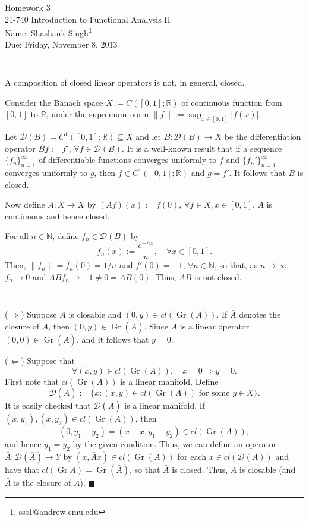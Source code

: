 \documentclass[11pt]{article}
\makeatletter
\newcounter{questionCounter}
\newcounter{partCounter}[questionCounter]
\newenvironment{question}[2][\arabic{questionCounter}]{%
    \setcounter{partCounter}{0}%
    \vspace{.25in} \hrule \vspace{0.5em}%
        \noindent{\bf #2}%
    \vspace{0.8em} \hrule \vspace{.10in}%
    \addtocounter{questionCounter}{1}%
}{}
\newcommand{\myname}{Shashank Singh\footnote{sss1@andrew.cmu.edu}}
\newcommand{\myclass}{21-740 Introduction to Functional Analysis II}
\newcommand{\myhwnum}{3}
\newcommand{\duedate}{Friday, November 8, 2013}
\renewcommand{\qed}{\quad \ensuremath{\blacksquare}}
\newcommand{\Gr}{\operatorname{Gr}}     %
\newcommand{\N}{\mathbb{N}}             %
\newcommand{\R}{\mathbb{R}}             %
\newcommand{\D}{\mathcal{D}}            %
\makeatother
\begin{document}
\thispagestyle{plain}

{\Large Homework \myhwnum} \\
\myclass \\
Name: \myname \\
Due: \duedate

\begin{question}{Problem 1}
A composition of closed linear operators is not, in general, closed.

Consider the Banach space $X := C([0,1];\R)$ of continuous function from
$[0,1]$ to $\R$, under the supremum norm $\|f\| := \sup_{x \in [0,1]} |f(x)|$.

Let $\D(B) = C^1([0,1];\R) \subseteq X$ and let $B : \D(B) \to X$ be the
differentiation operator $Bf := f'$, $\forall f \in \D(B)$. It is a well-known
result that if a sequence $\{f_n\}_{n = 1}^\infty$ of differentiable functions
converges uniformly to $f$ and $\{f_n'\}_{n = 1}^\infty$ converges uniformly to
$g$, then $f \in C^1([0,1];\R)$ and $g = f'$. It follows that $B$ is closed.

Now define $A : X \to X$ by $(Af)(x) := f(0)$, $\forall f \in X, x \in [0,1]$.
$A$ is continuous and hence closed.

For all $n \in \N$, define $f_n \in \D(B)$ by
\[f_n(x) := \frac{e^{-nx}}{n}, \quad \forall x \in [0,1].\]
Then, $\|f_n\| = f_n(0) = 1/n$ and $f'(0) = -1$, $\forall n \in \N$, so that, as
$n \to \infty$, $f_n \to 0$ and $ABf_n \to -1 \neq 0 = AB(0)$. Thus, $AB$ is
not closed.
\end{question}

\begin{question}{Problem 2}
($\Rightarrow$) Suppose $A$ is closable and $(0,y) \in cl(\Gr(A))$. If $\bar A$
denotes the closure of $A$, then $(0,y) \in \Gr(\bar A)$. Since $\bar A$ is a
linear operator $(0,0) \in \Gr(\bar A)$, and it follows that $y = 0$.

($\Leftarrow$) Suppose that
\[\forall (x,y) \in cl(\Gr(A)), \quad x = 0 \Rightarrow y = 0.\]
First note that $cl(\Gr(A))$ is a linear manifold. Define
\[\D(\bar A) := \{x : (x,y) \in cl(\Gr(A)) \mbox{ for some } y \in X\}.\]
It is easily checked that $\D(\bar A)$ is a linear manifold. If
$(x,y_1),(x,y_2) \in cl(\Gr(A))$, then
\[(0,y_1 - y_2) = (x - x, y_1 - y_2) \in cl(\Gr(A)),\] and hence $y_1 = y_2$ by
the given condition. Thus, we can define an operator
$\bar A : \D(\bar A) \to Y$ by $(x, \bar Ax) \in cl(\Gr(A))$ for each
$x \in cl(\D(A))$ and have that $cl(\Gr A) = \Gr(\bar A)$, so that $\bar A$ is
closed. Thus, $A$ is closable (and $\bar A$ is the closure of $A$). \qed
\end{question}
\end{document}
